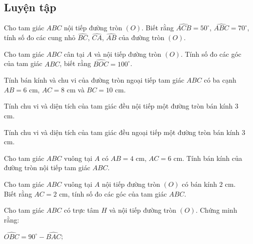 \begin{practice}
    \subsection{Luyện tập}

    \begin{questions}[resume=SBT]
        \item Cho tam giác $ABC$ nội tiếp đường tròn $(O)$. Biết rằng $\widehat{ACB}=50^\circ$, $\widehat{ABC}=70^\circ$, tính số đo các cung nhỏ $\widehat{BC}$, $\widehat{CA}$, $\widehat{AB}$ của đường tròn $(O)$.

        \answerline
        \answerline

        \item Cho tam giác $ABC$ cân tại $A$ và nội tiếp đường tròn $(O)$. Tính số đo các góc của tam giác $ABC$, biết rằng $\widehat{BOC}=100^\circ$.

        \answerline
        \answerline

        \item Tính bán kính và chu vi của đường tròn ngoại tiếp tam giác $ABC$ có ba cạnh $AB=6$ cm, $AC=8$ cm và $BC=10$ cm.

        \answerline
        \answerline

        \item Tính chu vi và diện tích của tam giác đều nội tiếp một đường tròn bán kính $3$ cm.

        \answerline
        \answerline

        \item Tính chu vi và diện tích của tam giác đều ngoại tiếp một đường tròn bán kính $3$ cm.

        \answerline
        \answerline

        \item Cho tam giác $ABC$ vuông tại $A$ có $AB=4$ cm, $AC=6$ cm. Tính bán kính của đường tròn nội tiếp tam giác $ABC$.

        \answerline
        \answerline

        \item Cho tam giác $ABC$ vuông tại $A$ nội tiếp đường tròn $(O)$ có bán kính $2$ cm. Biết rằng $AC=2$ cm, tính số đo các góc của tam giác $ABC$.

        \answerline
        \answerline

        \item Cho tam giác $ABC$ có trực tâm $H$ và nội tiếp đường tròn $(O)$. Chứng minh rằng:
        \begin{questions}
            \item $\widehat{OBC}=90^\circ-\widehat{BAC}$;


\end{questions}
\end{questions}
\end{practice}
